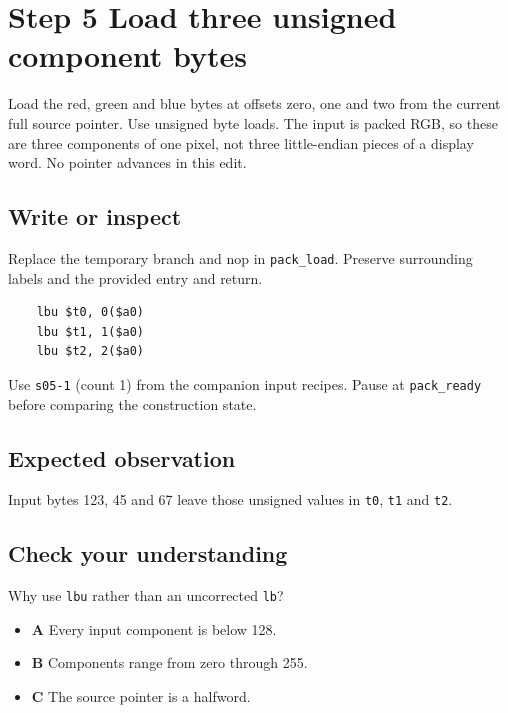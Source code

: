 \section{Step 5 Load three unsigned component bytes}\label{rgb-s05}

Load the red, green and blue bytes at offsets zero, one and two from the current full source pointer. Use unsigned byte loads. The input is packed RGB, so these are three components of one pixel, not three little-endian pieces of a display word. No pointer advances in this edit.

\subsection{Write or inspect}
Replace the temporary branch and nop in \texttt{pack\_load}. Preserve surrounding labels and the provided entry and return.

\begin{verbatim}
    lbu $t0, 0($a0)
    lbu $t1, 1($a0)
    lbu $t2, 2($a0)
\end{verbatim}
Use \texttt{s05-1} (count 1) from the companion input recipes. Pause at \texttt{pack\_ready} before comparing the construction state.

\subsection{Expected observation}
Input bytes 123, 45 and 67 leave those unsigned values in \texttt{t0}, \texttt{t1} and \texttt{t2}.

\subsection{Check your understanding}
Why use \texttt{lbu} rather than an uncorrected \texttt{lb}?

\begin{itemize}
  \item \textbf{A} Every input component is below 128.
  \item \textbf{B} Components range from zero through 255.
  \item \textbf{C} The source pointer is a halfword.
\end{itemize}
